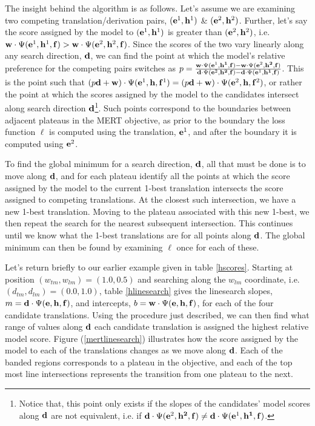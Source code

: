 \documentclass[11pt]{article}
\begin{document}
The insight behind the algorithm is as follows. Let's assume we are examining two competing translation/derivation pairs, $({\bf e}^1, {\bf h}^1)$ \& $({\bf e}^2, {\bf h}^2)$. Further, let's say the score assigned by the model to $({\bf e}^1, {\bf h}^1)$ is greater than  $({\bf e}^2, {\bf h}^2)$, i.e. \mbox{${\bf w} \cdot \Psi({\bf e}^1, {\bf h}^1, {\bf f}) > {\bf w} \cdot \Psi({\bf e}^2, {\bf h}^2, {\bf f})$}. Since the scores of the two vary linearly along any search direction, ${\bf d}$, we can find the point at which the model's relative preference for the competing pairs switches as $p = \frac{{\bf w} \cdot \Psi({\bf e}^1, {\bf h^1}, {\bf f}) - {\bf w} \cdot \Psi({\bf e}^2, {\bf h^2}, {\bf f})}{{\bf d} \cdot \Psi({\bf e}^2, {\bf h^2}, {\bf f}) - {\bf d} \cdot \Psi({\bf e}^1, {\bf h^1}, {\bf f})}$. This is the point such that $(p{\bf d} + {\bf w}) \cdot \Psi({\bf e}^1, {\bf h}, {\bf f}^1) = (p{\bf d} + {\bf w}) \cdot \Psi({\bf e}^2, {\bf h}, {\bf f}^2)$, or rather the point at which the scores assigned by the model to the candidates intersect along search direction ${\bf d}$\footnote{Notice that, this point only exists if the slopes of the candidates' model scores along ${\bf d}$ are not equivalent, i.e. if ${\bf d} \cdot \Psi({\bf e}^2, {\bf h^2}, {\bf f}) \neq {\bf d} \cdot \Psi({\bf e}^1, {\bf h^1}, {\bf f})$.}. Such points correspond to the boundaries between adjacent plateaus in the MERT objective, as prior to the boundary the loss function $\ell$ is computed using the translation, ${\bf e}^1$, and after the boundary it is computed using ${\bf e}^2$. 

To find the global minimum for a search direction, ${\bf d}$, all that must be done is to move along ${\bf d}$, and for each plateau identify all the points at which the score assigned by the model to the current 1-best translation intersects the score assigned to competing translations. At the closest such intersection, we have a new 1-best translation. Moving to the plateau associated with this new 1-best, we then repeat the search for the nearest subsequent intersection. This continues until we know what the 1-best translations are for all points along ${\bf d}$. The global minimum can then be found by examining $\ell$ once for each of these.

Let's return briefly to our earlier example given in table \ref{hscores}. Starting at position $(w_{tm}, w_{lm}) = (1.0, 0.5)$ and searching along the $w_{lm}$ coordinate, i.e. $(d_{tm}, d_{lm}) = (0.0, 1.0)$, table \ref{hlinesearch} gives the linesearch slopes, $m = {\bf d} \cdot \Psi({\bf e}, {\bf h}, {\bf f})$, and intercepts, $b = {\bf w} \cdot \Psi({\bf e}, {\bf h}, {\bf f})$, for each of the four candidate translations. Using the procedure just described, we can then find what range of values along ${\bf d}$ each candidate translation is assigned the highest relative model score.  Figure (\ref{mertlinesearch}) illustrates how the score assigned by the model to each of the translations changes as we move along ${\bf d}$. Each of the banded regions corresponds to a plateau in the objective, and each of the top most line intersections represents the transition from one plateau to the next. 
\end{document}
